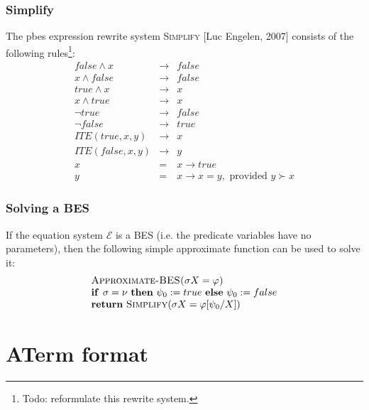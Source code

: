 \documentclass{article}
\begin{document}
\subsubsection{Simplify}

The pbes expression rewrite system \textsc{Simplify} [Luc Engelen, 2007]
consists of the following rules\footnote{%
Todo: reformulate this rewrite system.}:%
\begin{eqnarray*}
false\wedge x &\rightarrow &false \\
x\wedge false &\rightarrow &false \\
true\wedge x &\rightarrow &x \\
x\wedge true &\rightarrow &x \\
\lnot true &\rightarrow &false \\
\lnot false &\rightarrow &true \\
ITE(true,x,y) &\rightarrow &x \\
ITE(false,x,y) &\rightarrow &y \\
x &=&x\rightarrow true \\
y &=&x\rightarrow x=y,\text{ provided }y\succ x
\end{eqnarray*}

\subsubsection{Solving a BES}

If the equation system $\mathcal{E}$ is a BES (i.e. the predicate variables
have no parameters), then the following simple approximate function can be
used to solve it:%
\begin{equation*}
\begin{array}{l}
\text{\textsc{Approximate-BES(}}\sigma X=\varphi \text{\textsc{)}} \\
\text{\textbf{if }}\sigma =\nu \text{ \textbf{then} }\psi _{0}:=true \text{
\textbf{else} }\psi _{0}:=false \\
\text{\textbf{return} \textsc{Simplify}(}\sigma X=\varphi \lbrack \psi
_{0}/X]\text{)}%
\end{array}%
\end{equation*}

\newpage

\appendix

\section{ATerm format}
\end{document}
